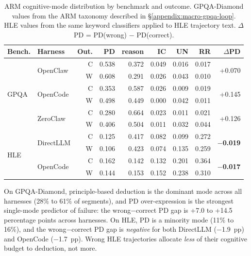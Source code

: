 \begin{table}[t]
\centering
\small
\caption{%
  ARM cognitive-mode distribution by benchmark and outcome.
  GPQA-Diamond values from the ARM taxonomy described in
  \S\ref{appendix:macro-gpqa-loop}.
  HLE values from the same keyword classifiers applied to HLE trajectory text.
  $\Delta$PD = PD(wrong) $-$ PD(correct).
}
\label{tab:cross-arm-benchmark}
\setlength{\tabcolsep}{3pt}
\begin{tabular}{llrrrrrrr}
\toprule
Bench. & Harness & Out. & PD & reason & IC & UN & RR & $\Delta$PD \\
\midrule
\multirow{6}{*}{GPQA}
& \multirow{2}{*}{OpenClaw}
  & C & 0.538 & 0.372 & 0.049 & 0.016 & 0.017 & \multirow{2}{*}{+0.070} \\
& & W & 0.608 & 0.291 & 0.026 & 0.043 & 0.010 & \\
\cmidrule{2-8}
& \multirow{2}{*}{OpenCode}
  & C & 0.353 & 0.587 & 0.026 & 0.009 & 0.019 & \multirow{2}{*}{+0.145} \\
& & W & 0.498 & 0.449 & 0.000 & 0.042 & 0.011 & \\
\cmidrule{2-8}
& \multirow{2}{*}{ZeroClaw}
  & C & 0.280 & 0.664 & 0.023 & 0.011 & 0.021 & \multirow{2}{*}{+0.126} \\
& & W & 0.406 & 0.504 & 0.011 & 0.032 & 0.044 & \\
\midrule
\multirow{4}{*}{HLE}
& \multirow{2}{*}{DirectLLM}
  & C & 0.125 & 0.417 & 0.082 & 0.099 & 0.272 & \multirow{2}{*}{\textbf{$-$0.019}} \\
& & W & 0.106 & 0.423 & 0.074 & 0.135 & 0.259 & \\
\cmidrule{2-8}
& \multirow{2}{*}{OpenCode}
  & C & 0.162 & 0.142 & 0.132 & 0.201 & 0.364 & \multirow{2}{*}{\textbf{$-$0.017}} \\
& & W & 0.144 & 0.153 & 0.152 & 0.238 & 0.310 & \\
\bottomrule
\end{tabular}
\end{table}


On GPQA-Diamond, principle-based deduction is the dominant mode across all
harnesses (28\% to 61\% of segments), and PD over-expression is the
strongest single-mode predictor of failure: the wrong$-$correct PD gap is
+7.0 to +14.5 percentage points across harnesses.
On HLE, PD is a minority mode (11\% to 16\%), and the wrong$-$correct PD gap
is \emph{negative} for both DirectLLM ($-$1.9~pp) and OpenCode ($-$1.7~pp).
Wrong HLE trajectories allocate \emph{less} of their cognitive budget to
deduction, not more.


